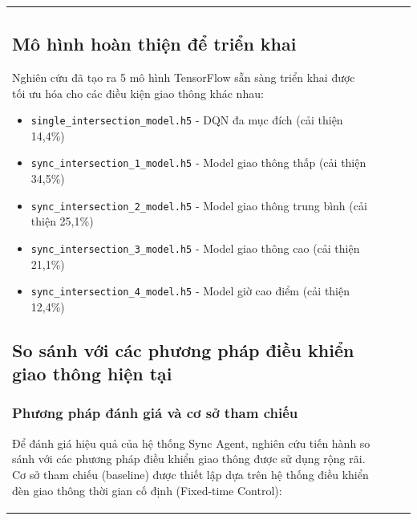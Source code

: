 \begin{table}[!htp]
\begin{tabular}{@{}lccc@{}}

\subsection{Mô hình hoàn thiện để triển khai}

Nghiên cứu đã tạo ra 5 mô hình TensorFlow sẵn sàng triển khai được tối ưu hóa cho các điều kiện giao thông khác nhau:

\begin{itemize}
            \item \texttt{single\_intersection\_model.h5} - DQN đa mục đích (cải thiện 14,4\%)
    \item \texttt{sync\_intersection\_1\_model.h5} - Model giao thông thấp (cải thiện 34,5\%)
    \item \texttt{sync\_intersection\_2\_model.h5} - Model giao thông trung bình (cải thiện 25,1\%)  
    \item \texttt{sync\_intersection\_3\_model.h5} - Model giao thông cao (cải thiện 21,1\%)
    \item \texttt{sync\_intersection\_4\_model.h5} - Model giờ cao điểm (cải thiện 12,4\%)
\end{itemize}

\subsection{So sánh với các phương pháp điều khiển giao thông hiện tại}

\subsubsection{Phương pháp đánh giá và cơ sở tham chiếu}

Để đánh giá hiệu quả của hệ thống Sync Agent, nghiên cứu tiến hành so sánh với các phương pháp điều khiển giao thông được sử dụng rộng rãi. Cơ sở tham chiếu (baseline) được thiết lập dựa trên hệ thống điều khiển đèn giao thông thời gian cố định (Fixed-time Control):


\end{tabular}
\end{table}
